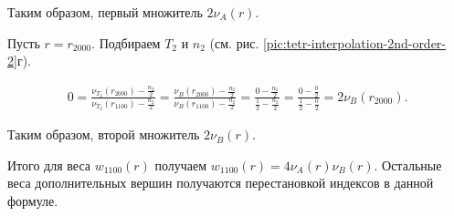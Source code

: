 Таким образом, первый множитель $2\nu_{A}(r)$.

Пусть $r = r_{2000}$. Подбираем $T_2$ и $n_2$ (см. рис. \ref{pic:tetr-interpolation-2nd-order-2}г).

\begin{align}
0 = \frac{ \nu_{T_2}(r_{2000}) - \frac{n_2}{2} }{ \nu_{T_2}(r_{1100}) - \frac{n_2}{2} } = \frac{ \nu_{B}(r_{2000}) - \frac{n_2}{2} }{ \nu_{B}(r_{1100}) - \frac{n_2}{2} } = \frac{ 0 - \frac{n_2}{2} }{ \frac{1}{2} - \frac{n_2}{2} } = \frac{ 0 - \frac{0}{2} }{ \frac{1}{2} - \frac{0}{2} } = 2\nu_{B}(r_{2000}).
\end{align}

Таким образом, второй множитель $2\nu_{B}(r)$.

Итого для веса $w_{1100}(r)$ получаем $w_{1100}(r) = 4 \nu_{A}(r) \nu_{B}(r)$. Остальные веса дополнительных вершин получаются перестановкой индексов в данной формуле.



